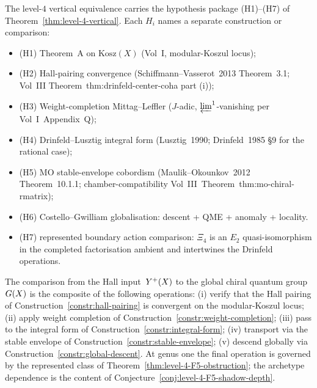\begin{remark}
\label{rem:level-4-hypothesis-package}
The level-$4$ vertical equivalence carries the hypothesis package
\textup{(H1)--(H7)} of
Theorem~\ref{thm:level-4-vertical}. Each $H_i$ names a separate
construction or comparison:
\begin{itemize}[leftmargin=*]
\item (H1) Theorem~A on $\mathrm{Kosz}(X)$
(Vol~I, modular-Koszul locus);
\item (H2) Hall-pairing convergence
(Schiffmann--Vasserot~2013 Theorem~3.1; Vol~III
Theorem~\textup{thm:drinfeld-center-coha} part (i));
\item (H3) Weight-completion Mittag--Leffler
($J$-adic, $\varprojlim^{1}$-vanishing per
Vol~I~Appendix~Q);
\item (H4) Drinfeld--Lusztig integral form
(Lusztig~1990; Drinfeld~1985 \S 9 for the rational case);
\item (H5) MO stable-envelope cobordism
(Maulik--Okounkov~2012 Theorem~10.1.1; chamber-compatibility
Vol~III~Theorem~\textup{thm:mo-chiral-rmatrix});
\item (H6) Costello--Gwilliam globalisation:
descent + QME + anomaly + locality.
\item (H7) represented boundary action comparison:
$\Xi_4$ is an $E_2$ quasi-isomorphism in the completed
factorisation ambient and intertwines the Drinfeld operations.
\end{itemize}
\end{remark}

\begin{remark}
\label{rem:level-4-heal-path}
The comparison from the Hall input~$Y^{+}(X)$ to the global chiral
quantum group~$G(X)$ is the composite of the following operations:
\textup{(i)} verify that the Hall pairing of
Construction~\ref{constr:hall-pairing} is convergent on the
modular-Koszul locus; \textup{(ii)} apply weight completion of
Construction~\ref{constr:weight-completion}; \textup{(iii)} pass to
the integral form of Construction~\ref{constr:integral-form};
\textup{(iv)} transport via the stable envelope of
Construction~\ref{constr:stable-envelope};
\textup{(v)} descend globally via
Construction~\ref{constr:global-descent}.  At genus one the final
operation is governed by the represented class of
Theorem~\ref{thm:level-4-F5-obstruction}; the archetype dependence is
the content of Conjecture~\ref{conj:level-4-F5-shadow-depth}.
\end{remark}

